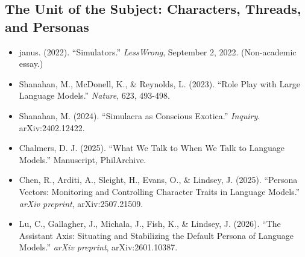 \documentclass[11pt,letterpaper]{article}
\begin{document}
\subsection*{The Unit of the Subject: Characters, Threads, and Personas}
\begin{itemize}[leftmargin=1.5em]
  \item janus. (2022). ``Simulators.'' \textit{LessWrong}, September 2, 2022. (Non-academic essay.)
  \item Shanahan, M., McDonell, K., \& Reynolds, L. (2023). ``Role Play with Large Language Models.'' \textit{Nature}, 623, 493-498.
  \item Shanahan, M. (2024). ``Simulacra as Conscious Exotica.'' \textit{Inquiry}. arXiv:2402.12422.
  \item Chalmers, D. J. (2025). ``What We Talk to When We Talk to Language Models.'' Manuscript, PhilArchive.
  \item Chen, R., Arditi, A., Sleight, H., Evans, O., \& Lindsey, J. (2025). ``Persona Vectors: Monitoring and Controlling Character Traits in Language Models.'' \textit{arXiv preprint}, arXiv:2507.21509.
  \item Lu, C., Gallagher, J., Michala, J., Fish, K., \& Lindsey, J. (2026). ``The Assistant Axis: Situating and Stabilizing the Default Persona of Language Models.'' \textit{arXiv preprint}, arXiv:2601.10387.
\end{itemize}
\end{document}

